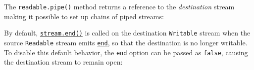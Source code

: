 The \texttt{readable.pipe()} method returns a reference to the
\emph{destination} stream making it possible to set up chains of piped
streams:

\begin{Shaded}
\begin{Highlighting}[]
\OperatorTok{=} \NormalTok{(}\NormalTok{)}\OperatorTok{;}
\OperatorTok{=} \NormalTok{(}\NormalTok{)}\OperatorTok{;}
\OperatorTok{=}\NormalTok{(}\NormalTok{)}\OperatorTok{;}
\OperatorTok{=}\NormalTok{()}\OperatorTok{;}
\OperatorTok{=}\NormalTok{(}\NormalTok{)}\OperatorTok{;}
\OperatorTok{;}
\end{Highlighting}
\end{Shaded}

By default,
\hyperref[writableendchunk-encoding-callback]{\texttt{stream.end()}} is
called on the destination \texttt{Writable} stream when the source
\texttt{Readable} stream emits
\hyperref[event-end]{\texttt{\textquotesingle{}end\textquotesingle{}}},
so that the destination is no longer writable. To disable this default
behavior, the \texttt{end} option can be passed as \texttt{false},
causing the destination stream to remain open:

\begin{Shaded}
\begin{Highlighting}[]
\OperatorTok{,}\NormalTok{ \{ }\OperatorTok{:} \NormalTok{ \})}\OperatorTok{;}
\NormalTok{(}\OperatorTok{,}\NormalTok{ () }\KeywordTok{=\textgreater{}}\NormalTok{ \{}
\NormalTok{(}\StringTok{\textquotesingle{}}\NormalTok{)}\OperatorTok{;}
\NormalTok{\})}\OperatorTok{;}
\end{Highlighting}
\end{Shaded}

